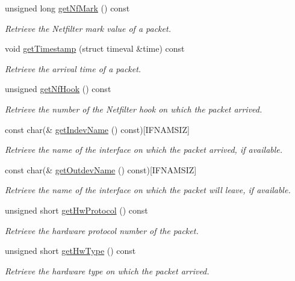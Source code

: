 \begin{DoxyCompactItemize}
unsigned long \hyperlink{classIPQ_1_1IpqPacket_ab97f0a4348e53cb69ed1da74e422dc78}{get\-Nf\-Mark} () const 
\begin{DoxyCompactList}\small\item\em \-Retrieve the \-Netfilter mark value of a packet. \end{DoxyCompactList}\item 
void \hyperlink{classIPQ_1_1IpqPacket_a430ce4f89e651724efdf56c9c1b1647e}{get\-Timestamp} (struct timeval \&time) const 
\begin{DoxyCompactList}\small\item\em \-Retrieve the arrival time of a packet. \end{DoxyCompactList}\item 
unsigned \hyperlink{classIPQ_1_1IpqPacket_ae13884fedce165702f4b71e0e4d93c0b}{get\-Nf\-Hook} () const 
\begin{DoxyCompactList}\small\item\em \-Retrieve the number of the \-Netfilter hook on which the packet arrived. \end{DoxyCompactList}\item 
const char(\& \hyperlink{classIPQ_1_1IpqPacket_a4cf04ca5da28410f27d87edefd679532}{get\-Indev\-Name} () const)\mbox{[}\-I\-F\-N\-A\-M\-S\-I\-Z\mbox{]}
\begin{DoxyCompactList}\small\item\em \-Retrieve the name of the interface on which the packet arrived, if available. \end{DoxyCompactList}\item 
const char(\& \hyperlink{classIPQ_1_1IpqPacket_a46dced8057de3bba7abfaaa63d7afcd4}{get\-Outdev\-Name} () const)\mbox{[}\-I\-F\-N\-A\-M\-S\-I\-Z\mbox{]}
\begin{DoxyCompactList}\small\item\em \-Retrieve the name of the interface on which the packet will leave, if available. \end{DoxyCompactList}\item 
unsigned short \hyperlink{classIPQ_1_1IpqPacket_ae150e294f043f4c699231a85d3b1ae0f}{get\-Hw\-Protocol} () const 
\begin{DoxyCompactList}\small\item\em \-Retrieve the hardware protocol number of the packet. \end{DoxyCompactList}\item 
unsigned short \hyperlink{classIPQ_1_1IpqPacket_ab6b76b146111c7ad11b96e87efe6634c}{get\-Hw\-Type} () const 
\begin{DoxyCompactList}\small\item\em \-Retrieve the hardware type on which the packet arrived. \end{DoxyCompactList}\item 

\end{DoxyCompactItemize}
